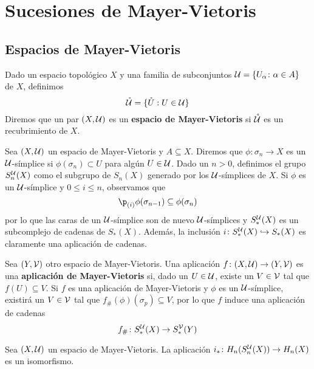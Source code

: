 \setchapterpreamble[u]{\margintoc}

\chapter{Sucesiones de Mayer-Vietoris}
\section{Espacios de Mayer-Vietoris}
Dado un espacio topológico $X$ y una familia de subconjuntos $\mathcal{U}=
\{U_\alpha\colon \alpha \in A\}$ de $X$, definimos
\[\mathring{\mathcal{U}}=\{\mathring{U}: U \in \mathcal{U}\}\]
Diremos que un par $(X,\mathcal{U})$ es un \textbf{espacio de Mayer-Vietoris}
si $\mathring{\mathcal{U}}$ es un recubrimiento de $X$.

Sea $(X,\mathcal{U})$ un espacio de Mayer-Vietoris y $A \subseteq X$. Diremos
que $\phi\colon \sigma_n \to X$ es un $\mathcal{U}$-símplice si $\phi(\sigma_n)
\subset U$ para algún $U \in \mathcal{U}$. Dado un $n > 0$, definimos el grupo
$S^{\mathcal{U}}_n(X)$ como el subgrupo de $S_n(X)$ generado por los
$\mathcal{U}$-símplices de $X$. Si $\phi$ es un $\mathcal{U}$-símplice y $0
\leq i \leq n$, observamos que
\[\p_{(i)}\phi(\sigma_{n-1}) \subseteq \phi(\sigma_n)\]
por lo que las caras de un $\mathcal{U}$-símplice son de nuevo
$\mathcal{U}$-símplices y $S^{\mathcal{U}}_*(X)$ es un subcomplejo de cadenas de
$S_*(X)$. Además, la inclusión $i\colon S^{\mathcal{U}}_*(X) \hookrightarrow
S_*(X)$ es claramente una aplicación de cadenas.


Sea $(Y,\mathcal{V})$ otro espacio de Mayer-Vietoris. Una aplicación $f\colon
(X,\mathcal{U}) \to (Y,\mathcal{V})$ es una \textbf{aplicación de Mayer-Vietoris} si,
dado un $U \in \mathcal{U}$, existe un $V \in \mathcal{V}$ tal que $f(U) \subseteq V$.
Si $f$ es una aplicación de  Mayer-Vietoris y $\phi$ es un $\mathcal{U}$-símplice,
existirá un $V \in \mathcal{V}$ tal que $f_\#(\phi)(\sigma_p) \subseteq V$,
por lo que $f$ induce una aplicación de cadenas
\[f_\#\colon S^{\mathcal{U}}_*(X) \to S^{\mathcal{V}}_*(Y)\]

\begin{theorem}
Sea $(X,\mathcal{U})$ un espacio de Mayer-Vietoris. La aplicación $i_*\colon
H_n(S_n^{\mathcal{U}}(X)) \to H_n(X)$ es un isomorfismo.
\end{theorem}

